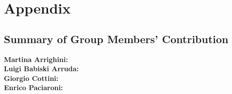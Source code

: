 \documentclass[12pt, openright, oneside]{report}
\begin{document}
\chapter*{Appendix}\label{chapter:appendix}


\section*{Summary of Group Members' Contribution}

\textbf{Martina Arrighini:}\\
\textbf{Luigi Babiski Arruda:}\\ 
\textbf{Giorgio Cottini:}\\
\textbf{Enrico Paciaroni:}\\

\end{document}
